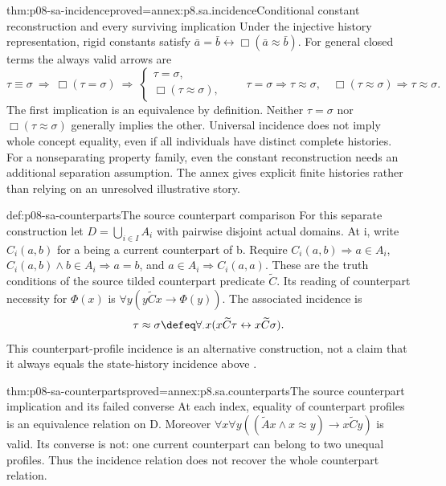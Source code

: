\begin{hbtheorem}{thm:p08-sa-incidence}{proved=annex:p8.sa.incidence}{Conditional constant reconstruction and every surviving implication}
Under the injective history representation, rigid constants satisfy
\(\bar a=\bar b\leftrightarrow\Box(\bar a\approx\bar b)\).
For general closed terms the always valid arrows are
\[
 \tau\equiv\sigma\ \Longrightarrow\ \Box(\tau=\sigma)
 \ \Longrightarrow\ \begin{cases}\tau=\sigma,\\
                              \Box(\tau\approx\sigma),\end{cases}
 \qquad
 \tau=\sigma\Longrightarrow\tau\approx\sigma,
 \quad\Box(\tau\approx\sigma)\Longrightarrow\tau\approx\sigma.
\]
The first implication is an equivalence by definition.
Neither \(\tau=\sigma\) nor \(\Box(\tau\approx\sigma)\)
generally implies the other. Universal incidence does not imply whole
concept equality, even if all individuals have distinct complete histories.
For a nonseparating property family, even the constant reconstruction
needs an additional separation assumption. The annex gives explicit
finite histories rather than relying on an unresolved illustrative story.
\end{hbtheorem}

\begin{hbdefinition}{def:p08-sa-counterparts}{The source counterpart comparison}
For this separate construction let \(D=\bigcup_{i\in I}A_i\)
with pairwise disjoint actual domains. At i, write \(C_i(a,b)\)
for a being a current counterpart of b. Require
\(C_i(a,b)\Rightarrow a\in A_i\),
\(C_i(a,b)\land b\in A_i\Rightarrow a=b\), and
\(a\in A_i\Rightarrow C_i(a,a)\).
These are the truth conditions of the source tilded counterpart
predicate \(\widetilde C\). Its reading of counterpart necessity
for \(\Phi(x)\) is \(\forall y(y\widetilde C x\to\Phi(y))\).
The associated incidence is
\[
 \tau\approx\sigma\defeq\forall_{\cdot}x
       (x\widetilde C\tau\leftrightarrow x\widetilde C\sigma).
\]
This counterpart-profile incidence is an alternative construction,
not a claim that it always equals the state-history incidence above
\cite[pp.~169--171]{Scott1970}.
\end{hbdefinition}

\begin{hbtheorem}{thm:p08-sa-counterparts}{proved=annex:p8.sa.counterparts}{The source counterpart implication and its failed converse}
At each index, equality of counterpart profiles is an equivalence
relation on D. Moreover
\(\forall x\forall y((\widetilde A x\land x\approx y)
\to x\widetilde C y)\) is valid. Its converse is not:
one current counterpart can belong to two unequal profiles. Thus the
incidence relation does not recover the whole counterpart relation.
\end{hbtheorem}

